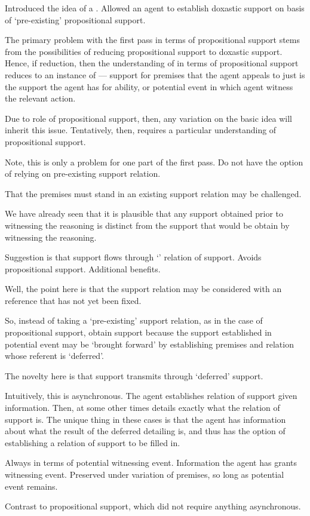 \begin{note}
  Introduced the idea of a \future{}.
  Allowed an agent to establish doxastic support on basis of `pre-existing' propositional support.

  The primary problem with the first pass in terms of propositional support stems from the possibilities of reducing propositional support to doxastic support.
  Hence, if reduction, then the understanding of \WR{} in terms of propositional support reduces to an instance of \AR{} --- support for premises that the agent appeals to just is the support the agent has for ability, or potential event in which agent witness the relevant action.

  Due to role of propositional support, then, any variation on the basic idea will inherit this issue.
  Tentatively, then, \WR{} requires a particular understanding of propositional support.

  Note, this is only a problem for one part of the first pass.
  Do not have the option of relying on pre-existing support relation.

  That the premises must stand in an existing support relation may be challenged.

  We have already seen that it is plausible that any support obtained prior to witnessing the reasoning is distinct from the support that would be obtain by witnessing the reasoning.

  Suggestion is that support flows through `\future{}' relation of support.
  Avoids propositional support.
  Additional benefits.
\end{note}

\begin{note}[Support]
  Well, the point here is that the support relation may be considered with an reference that has not yet been fixed.

  So, instead of taking a `pre-existing' support relation, as in the case of propositional support, obtain support because the support established in potential event may be `brought forward' by establishing premises and relation whose referent is `deferred'.

  The novelty here is that support transmits through `deferred' support.
\end{note}

\begin{note}[Asynchronous]
  Intuitively, this is asynchronous.
  The agent establishes relation of support given information.
  Then, at some other times details exactly what the relation of support is.
  The unique thing in these cases is that the agent has information about what the result of the deferred detailing is, and thus has the option of establishing a relation of support to be filled in.

  Always in terms of potential witnessing event.
  Information the agent has grants witnessing event.
  Preserved under variation of premises, so long as potential event remains.

  Contrast to propositional support, which did not require anything asynchronous.
\end{note}

